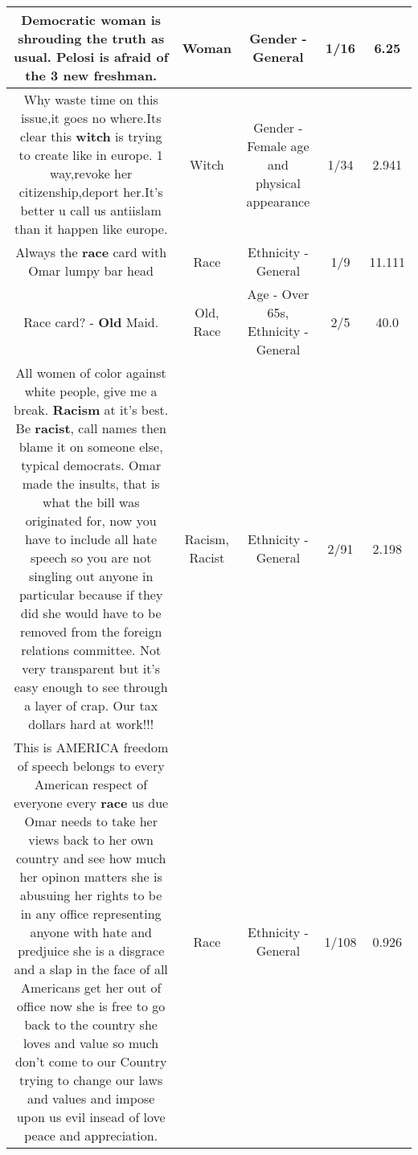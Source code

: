 \documentclass[11pt]{article}
\newlength\mylength
\begin{document}
\begin{center}
\begin{longtable}{|C{.65\mylength}|C{.30\mylength}|C{.12\mylength}|C{.12\mylength}|C{.12\mylength}|}
  \small Democratic \textbf{woman} is shrouding the truth as usual.  Pelosi is afraid of the 3 new freshman.\normalsize   & Woman & Gender - General & 1/16 & 6.25 \\  \hline
  \small Why waste time on this issue,it goes no where.Its clear this \textbf{witch} is trying to create like in europe. 1 way,revoke her citizenship,deport her.It's better u call us antiislam than it happen like europe.\normalsize   & Witch & Gender - Female age and physical appearance & 1/34 & 2.941 \\  \hline
  \small Always the \textbf{race} card with Omar lumpy bar head\normalsize   & Race & Ethnicity - General & 1/9 & 11.111 \\  \hline
  \small Race card? - \textbf{Old} Maid.\normalsize   & Old, Race & Age - Over 65s, Ethnicity - General & 2/5 & 40.0 \\  \hline
  \small All women of color against white people, give me a break. \textbf{Racism} at it's best. Be \textbf{racist}, call names then blame it on someone else, typical democrats. Omar made the insults, that is what the bill was originated for, now you have to include all hate speech so you are not singling out anyone in particular because if they did she would have to be removed from the foreign relations committee. Not very transparent but it's easy enough to see through a layer of crap. Our tax dollars hard at work!!!\normalsize   & Racism, Racist & Ethnicity - General & 2/91 & 2.198 \\  \hline
  \small This is AMERICA freedom of speech belongs to every American respect of everyone every \textbf{race} us due Omar needs to take her views back to her own country and see how much her opinon matters she is abusuing her rights to be in any office representing anyone with hate and predjuice she is a disgrace and a slap in the face of all Americans get her out of office now she is free to go back to the country she loves and value so much don't come to our Country trying to change our laws and values and impose upon us evil insead of love peace and appreciation.\normalsize   & Race & Ethnicity - General & 1/108 & 0.926 \\  \hline

\end{longtable}
\end{center}
\end{document}
